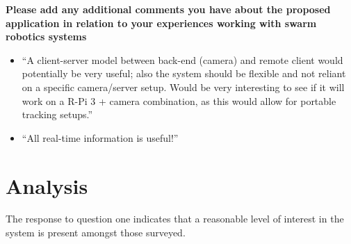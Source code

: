 \vspace{1cm}

\textbf{Please add any additional comments you have about the proposed application in relation to your experiences working with swarm robotics systems}

\begin{itemize}
\item ``A client-server model between back-end (camera) and remote client would potentially be very useful; also the system should be flexible and not reliant on a specific camera/server setup. Would be very interesting to see if it will work on a R-Pi 3 + camera combination, as this would allow for portable tracking setups.''
\item ``All real-time information is useful!''
\end{itemize}


\section{Analysis}
The response to question one indicates that a reasonable level of interest in the system is present amongst those surveyed. 

